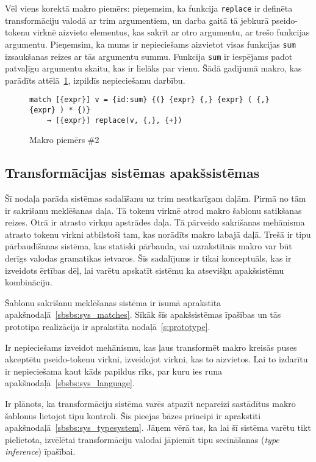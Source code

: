 Vēl viens korektā makro piemērs: pieņemsim, ka funkcija \verb|replace| ir definēta transformāciju valodā ar trim argumentiem, un darba gaitā tā jebkurā pseido-tokenu virknē aizvieto elementus, kas sakrīt ar otro argumentu, ar trešo funkcijas argumentu. Pieņemsim, ka mums ir nepieciešams aizvietot visas funkcijas \verb|sum| izsaukšanas reizes ar tās argumentu summu. Funkcija \verb|sum| ir iespējams padot patvaļīgu argumentu skaitu, kas ir lielāks par vienu. Šādā gadījumā makro, kas parādīts attēlā~\ref{fig:matchsample2}, izpildīs nepieciešamu darbību.

\begin{figure}[h!]
\begin{verbatim}
match [{expr}] v = {id:sum} {(} {expr} {,} {expr} ( {,} {expr} ) * {)}
    → [{expr}] replace(v, {,}, {+})
\end{verbatim}
\caption{\label{fig:matchsample2}Makro piemērs \#2}
\end{figure}

\subsection{\label{sbs:sys_qualities}Transformācijas sistēmas apakšsistēmas}

Šī nodaļa parāda sistēmas sadalīšanu uz trim neatkarīgam daļām. Pirmā no tām ir sakrišanu meklēšanas daļa. Tā tokenu virknē atrod makro šablonu satikšanas reizes. Otrā ir atrasto virkņu apstrādes daļa. Tā pārveido sakrišanas mehānisma atrasto tokenu virkni atbilstoši tam, kas norādīts makro labajā daļā. Trešā ir tipu pārbaudīšanas sistēma, kas statiski pārbauda, vai uzrakstītais makro var būt derīgs valodas gramatikas ietvaros. Šīs sadalījums ir tikai konceptuāls, kas ir izveidots ērtības dēļ, lai varētu apskatīt sistēmu ka atsevišķu apakšsistēmu kombināciju.

Šablonu sakrišanu meklēšanas sistēma ir īsumā aprakstīta apakšnodaļā~\ref{sbsbs:sys_matches}. Sīkāk šīs apakšsistēmas īpašības un tās prototipa realizācija ir aprakstīta nodaļā~\ref{s:prototype}.

Ir nepieciešams izveidot mehānismu, kas ļaus transformēt makro kreisās puses akceptētu pseido-tokenu virkni, izveidojot virkni, kas to aizvietos. Lai to izdarītu ir nepieciešama kaut kāds papildus rīks, par kuru ies runa apakšnodaļā~\ref{sbsbs:sys_language}.

Ir plānots, ka transformāciju sistēma varēs atpazīt nepareizi sastādītus makro šablonus lietojot tipu kontroli. Šīs pieejas bāzes principi ir aprakstīti apakšnodaļā~\ref{sbsbs:sys_typesystem}. Jāņem vērā tas, ka lai šī sistēma varētu tikt pielietota, izvēlētai transformāciju valodai jāpiemīt tipu secināšanas (\emph{type inference}) īpašībai.


